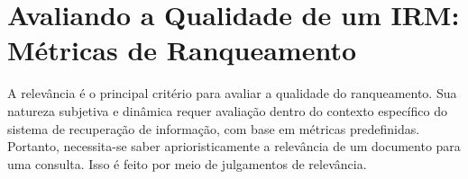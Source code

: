 \documentclass[
	12pt,				%
	openright,			%
	oneside,			%
	a4paper,			%
	english,			%
	french,				%
	spanish,			%
	brazil				%
	]{abntex2}
\begin{document}









\section{Avaliando a Qualidade de um IRM: Métricas de Ranqueamento}\label{sec:metricas-de-ranqueamento}

A relevância é o principal critério para avaliar a qualidade do ranqueamento.
Sua natureza subjetiva e dinâmica requer avaliação dentro do contexto específico do sistema de recuperação de informação,
com base em métricas predefinidas.
Portanto, necessita-se saber aprioristicamente a relevância de um documento para uma consulta.
Isso é feito por meio de julgamentos de relevância.
\end{document}
